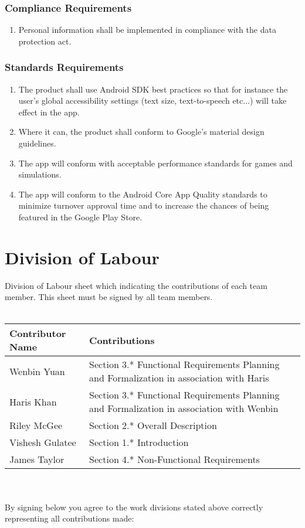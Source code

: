 \documentclass[]{article}
\begin{document}
\subsubsection{Compliance Requirements}
\label{ssub:compliance_requirements}
\begin{enumerate}[{LR}1. ]
	\item Personal information shall be implemented in compliance with the data protection act.
	\holdEnum
\end{enumerate}

\subsubsection{Standards Requirements}
\label{ssub:standards_requirements}
\begin{enumerate}[{LR}1. ]
	\resumeEnum
	\item The product shall use Android SDK best practices so that for instance the user's global accessibility settings (text size, text-to-speech etc...) will take effect in the app. 
	\item Where it can, the product shall conform to Google's material design guidelines.
	\item The app will conform with acceptable performance standards for games and simulations.
	\item The app will conform to the Android Core App Quality standards to minimize turnover approval time and to increase the chances of being featured in the Google Play Store.
\end{enumerate}


\newpage
\appendix
\section{Division of Labour}
\label{sec:division_of_labour}
Division of Labour sheet which indicating the contributions of each team member. This sheet must be signed by all team members.
\\
\\
\begin{tabular}{ | l | l | }
\hline
	\textbf{Contributor Name} & \textbf{Contributions}  \\
  	\hline
  	Wenbin Yuan & Section 3.* Functional Requirements Planning and Formalization in association with Haris\\ 		\hline
  	Haris Khan & Section 3.* Functional Requirements Planning and Formalization in association with Wenbin \\
  	\hline
  	Riley McGee & Section 2.* Overall Description
  	\\
  	\hline
  	Vishesh Gulatee & Section 1.* Introduction
  	\\
  	\hline
  	James Taylor & Section 4.* Non-Functional Requirements
  	\\
  	\hline
\end{tabular}
\\
\\
By signing below you agree to the work divisions stated above correctly representing all contributions made:
\end{document}
